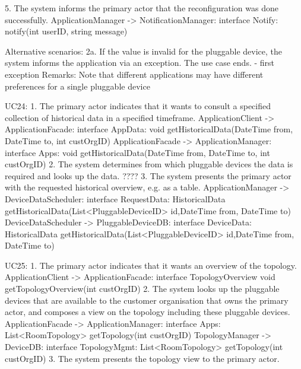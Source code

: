             5. The system informs the primary actor that the reconfiguration was done successfully.
                ApplicationManager -> NotificationManager: interface Notify: notify(int userID, string message)

            Alternative scenarios:
            2a. If the value is invalid for the pluggable device, the system informs the application via an
                exception. The use case ends.
                - first exception
            Remarks:
                Note that different applications may have different preferences for a single pluggable device

        UC24:
            1. The primary actor indicates that it wants to consult a specified collection of historical data in
                a specified timeframe.
                ApplicationClient -> ApplicationFacade: interface AppData:
                                                void getHistoricalData(DateTime from, DateTime to, int custOrgID)
                ApplicationFacade -> ApplicationManager: interface Apps:
                                                void getHistoricalData(DateTime from, DateTime to, int custOrgID)
            2. The system determines from which pluggable devices the data is required and looks up the data.
                 ????
            3. The system presents the primary actor with the requested historical overview, e.g. as a table.
                ApplicationManager -> DeviceDataScheduler: interface RequestData:
                                      HistoricalData getHistoricalData(List<PluggableDeviceID> id,DateTime from, DateTime to)
                DeviceDataScheduler -> PluggableDeviceDB: interface DeviceData:
                                      HistoricalData getHistoricalData(List<PluggableDeviceID> id,DateTime from, DateTime to)

        UC25:
            1. The primary actor indicates that it wants an overview of the topology.
                ApplicationClient -> ApplicationFacade: interface TopologyOverview
                                                               void getTopologyOverview(int custOrgID)
            2. The system looks up the pluggable devices that are available to the customer organisation
           that owns the primary actor, and composes a view on the topology including these pluggable devices.
                ApplicationFacade -> ApplicationManager: interface Apps: List<RoomTopology> getTopology(int custOrgID)
                TopologyManager -> DeviceDB: interface TopologyMgmt: List<RoomTopology> getTopology(int custOrgID)
            3. The system presents the topology view to the primary actor.

